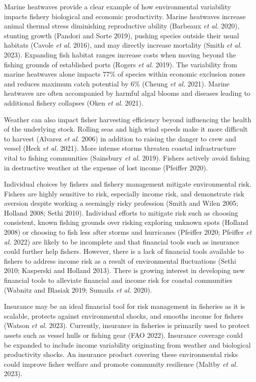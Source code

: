 \documentclass[
  letterpaper,
  DIV=11,
  numbers=noendperiod]{scrartcl}
\theoremstyle{plain}
\theoremstyle{plain}
\theoremstyle{remark}
\begin{document}
Marine heatwaves provide a clear example of how environmental
variability impacts fishery biological and economic productivity. Marine
heatwaves increase animal thermal stress diminishing reproductive
ability (Barbeaux \emph{et al.} 2020), stunting growth (Pandori and
Sorte 2019), pushing species outside their usual habitats (Cavole
\emph{et al.} 2016), and may directly increase mortality (Smith \emph{et
al.} 2023). Expanding fish habitat ranges increase costs when moving
beyond the fishing grounds of established ports (Rogers \emph{et al.}
2019). The variability from marine heatwaves alone impacts 77\% of
species within economic exclusion zones and reduces maximum catch
potential by 6\% (Cheung \emph{et al.} 2021). Marine heatwaves are often
accompanied by harmful algal blooms and diseases leading to additional
fishery collapses (Oken \emph{et al.} 2021).

Weather can also impact fisher harvesting efficiency beyond influencing
the health of the underlying stock. Rolling seas and high wind speeds
make it more difficult to harvest (Alvarez \emph{et al.} 2006) in
addition to raising the danger to crew and vessel (Heck \emph{et al.}
2021). More intense storms threaten coastal infrastructure vital to
fishing communities (Sainsbury \emph{et al.} 2019). Fishers actively
avoid fishing in destructive weather at the expense of lost income
(Pfeiffer 2020).

Individual choices by fishers and fishery management mitigate
environmental risk. Fishers are highly sensitive to risk, especially
income risk, and demonstrate risk aversion despite working a seemingly
risky profession (Smith and Wilen 2005; Holland 2008; Sethi 2010).
Individual efforts to mitigate risk such as choosing consistent, known
fishing grounds over risking exploring unknown spots (Holland 2008) or
choosing to fish less after storms and hurricanes (Pfeiffer 2020;
Pfeiffer \emph{et al.} 2022) are likely to be incomplete and that
financial tools such as insurance could further help fishers. However,
there is a lack of financial tools available to fishers to address
income risk as a result of environmental fluctuations (Sethi 2010;
Kasperski and Holland 2013). There is growing interest in developing new
financial tools to alleviate financial and income risk for coastal
communities (Wabnitz and Blasiak 2019; Sumaila \emph{et al.} 2020).

Insurance may be an ideal financial tool for risk management in
fisheries as it is scalable, protects against environmental shocks, and
smooths income for fishers (Watson \emph{et al.} 2023). Currently,
insurance in fisheries is primarily used to protect assets such as
vessel hulls or fishing gear (FAO 2022). Insurance coverage could be
expanded to include income variability originating from weather and
biological productivity shocks. An insurance product covering these
environmental risks could improve fisher welfare and promote community
resilience (Maltby \emph{et al.} 2023).
\end{document}
